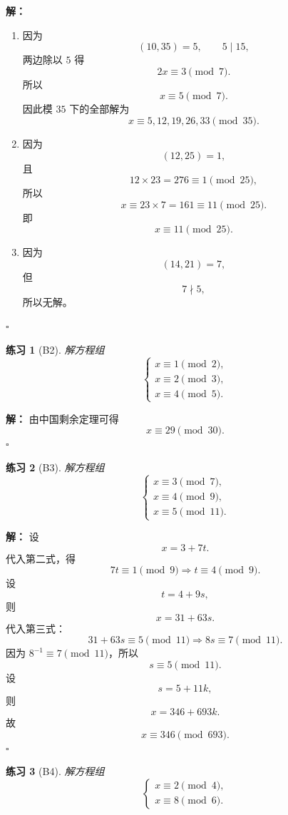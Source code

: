 \documentclass[11pt,a4paper,fontset=fandol]{ctexart}
\theoremstyle{formaltheorem}
\theoremstyle{formalexample}
\newtheorem{exercise}{练习}[section]
\newenvironment{solution}{\par\noindent\textbf{解：}}{\hfill$\square$\par}
\begin{document}
\begin{solution}
\begin{enumerate}
  \item 因为
  \[
  (10,35)=5,\qquad 5\mid 15,
  \]
  两边除以 $5$ 得
  \[
  2x\equiv 3\pmod 7.
  \]
  所以
  \[
  x\equiv 5\pmod 7.
  \]
  因此模 $35$ 下的全部解为
  \[
  \boxed{x\equiv 5,12,19,26,33\pmod{35}}.
  \]

  \item 因为
  \[
  (12,25)=1,
  \]
  且
  \[
  12\times 23=276\equiv 1\pmod{25},
  \]
  所以
  \[
  x\equiv 23\times 7=161\equiv 11\pmod{25}.
  \]
  即
  \[
  \boxed{x\equiv 11\pmod{25}}.
  \]

  \item 因为
  \[
  (14,21)=7,
  \]
  但
  \[
  7\nmid 5,
  \]
  所以无解。
\end{enumerate}
\end{solution}

\begin{exercise}[B2]
解方程组
\[
\begin{cases}
x\equiv 1\pmod 2,\\
x\equiv 2\pmod 3,\\
x\equiv 4\pmod 5.
\end{cases}
\]
\end{exercise}

\begin{solution}
由中国剩余定理可得
\[
\boxed{x\equiv 29\pmod{30}}.
\]
\end{solution}

\begin{exercise}[B3]
解方程组
\[
\begin{cases}
x\equiv 3\pmod 7,\\
x\equiv 4\pmod 9,\\
x\equiv 5\pmod{11}.
\end{cases}
\]
\end{exercise}

\begin{solution}
设
\[
x=3+7t.
\]
代入第二式，得
\[
7t\equiv 1\pmod 9\Rightarrow t\equiv 4\pmod 9.
\]
设
\[
t=4+9s,
\]
则
\[
x=31+63s.
\]
代入第三式：
\[
31+63s\equiv 5\pmod{11}
\Rightarrow 8s\equiv 7\pmod{11}.
\]
因为 $8^{-1}\equiv 7\pmod{11}$，所以
\[
s\equiv 5\pmod{11}.
\]
设
\[
s=5+11k,
\]
则
\[
x=346+693k.
\]
故
\[
\boxed{x\equiv 346\pmod{693}}.
\]
\end{solution}

\begin{exercise}[B4]
解方程组
\[
\begin{cases}
x\equiv 2\pmod 4,\\
x\equiv 8\pmod 6.
\end{cases}
\]
\end{exercise}
\end{document}
